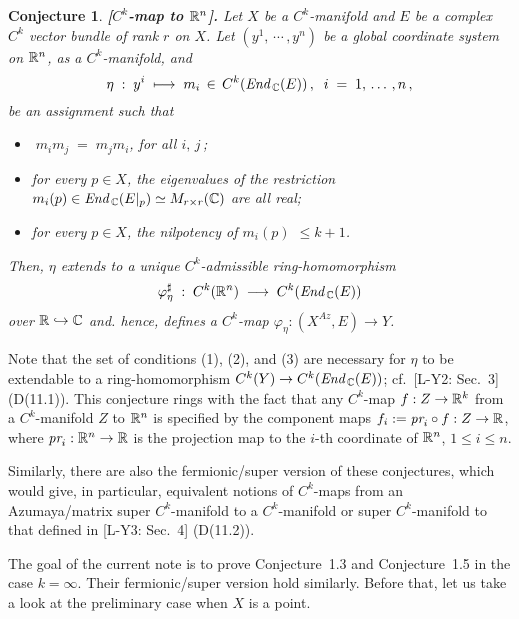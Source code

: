 \documentclass[11pt]{article}
\numberwithin{equation}{subsection}
\newtheorem{sconjecture}[stheorem]{Conjecture}
\newcommand{\End}{\mbox{\it End}\,}
\newcommand{\pr}{\mbox{\it pr}}
\begin{document}
\begin{sconjecture} {\bf [$C^k$-map to ${\Bbb R}^n$].}
 Let
  $X$ be a $C^k$-manifold  and $E$ be a complex $C^k$ vector bundle of rank $r$ on $X$.
 Let
  $(y^1,\,\cdots\,, y^n)$ be a global coordinate system on ${\Bbb R}^n$, as a $C^k$-manifold, and
  $$
    \eta\;:\; y^i\; \longmapsto\; m_i\,\in\, C^k(\End_{\Bbb C}(E))\,,\;\;
	i\;=\;1,\,\ldots\,,n\,,
  $$
 be an assignment  such that
  \begin{itemize}
   \item[(1)]
     $\;m_im_j\;=\;m_jm_i$, for all $i,\,j\,$;

   \item[(2)]
    for every $p\in X$,
	 the eigenvalues of the restriction
	   $m_i(p)\in \End_{\Bbb C}(E|_p)\simeq M_{r\times r}({\Bbb C})$
	   are all real;
	
   \item[(3)]
    for every $p\in X$,
	 the nilpotency of $m_i(p)$ $\le k+1$.
 \end{itemize}
 Then,
  $\eta$ extends to a unique $C^k$-admissible ring-homomorphism
  $$
    \varphi_{\eta}^{\sharp}\;:\;
	 C^k({\Bbb R}^n)\; \longrightarrow\; C^k(\End_{\Bbb C}(E))
  $$
  over ${\Bbb R}\hookrightarrow{\Bbb C}$ and. hence,
  defines a $C^k$-map $\varphi_{\eta}:(X^{\!A\!z},E)\rightarrow Y$.
\end{sconjecture}

\bigskip

Note that
  the set of conditions (1), (2), and (3) are necessary
    for $\eta$ to be extendable to a ring-homomorphism
    $C^k(Y)\rightarrow C^k(\End_{\Bbb C}(E))$;
  cf.\ [L-Y2: Sec.~3] (D(11.1)).
This conjecture rings with the fact that
 any $C^k$-map $f:Z\rightarrow {\Bbb R}^k$ from a $C^k$-manifold $Z$ to ${\Bbb R}^n$
  is specified by the component maps $f_i:=  \pr_i\circ f:Z\rightarrow {\Bbb R}$,
  where $\pr_i:{\Bbb R}^n\rightarrow {\Bbb R}$
   is the projection map to the $i$-th coordinate of ${\Bbb R}^n$, $1\le i\le n$.

\bigskip

Similarly, there are also the fermionic/super version of these conjectures,
 which would give, in particular, equivalent notions of
 $C^k$-maps from an Azumaya/matrix super $C^k$-manifold to a $C^k$-manifold or super $C^k$-manifold
 to that defined in [L-Y3: Sec.\ 4] (D(11.2)).

\bigskip

The goal of the current note is to prove Conjecture~1.3 and Conjecture~1.5 in the case $k=\infty$.
Their fermionic/super version hold similarly.
Before that, let us take a look at the preliminary case when $X$ is a point.
\end{document}

